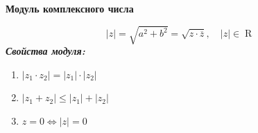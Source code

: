 \documentclass[a4paper, 12pt]{article}
\newcommand{\R}{\operatorname{R}}
\begin{document}
\begin{center}
    \textbf{Модуль комплексного числа}
\end{center}
$$|z|=\sqrt{a^2+b^2}=\sqrt{z\cdot\overline{z}}, \quad |z| \in \R$$
\textit{\textbf{Свойства модуля:}}
\begin{enumerate}
    \item $|z_1\cdot z_2|=|z_1|\cdot |z_2|$
    \item $|z_1+z_2| \leq |z_1| + |z_2|$
    \item $z=0 \Leftrightarrow |z|=0$
\end{enumerate}
\end{document}
